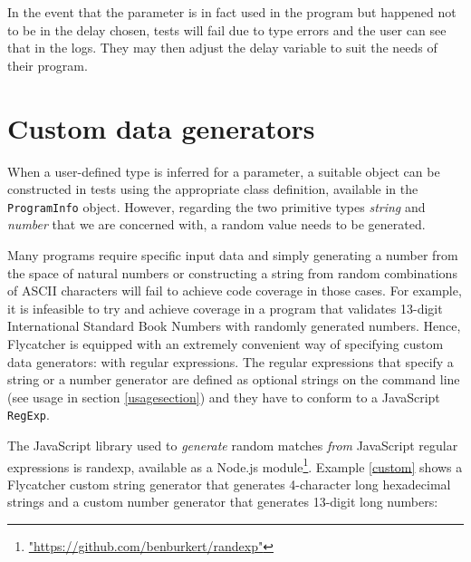 

In the event that the parameter is in fact used in the program but happened not to be in the delay chosen, tests will fail due to type errors and the user can see that in the logs. They may then adjust the delay variable to suit the needs of their program.

\section{Custom data generators}
When a user-defined type is inferred for a parameter, a suitable object can be constructed in tests using the appropriate class definition, available in the \texttt{ProgramInfo} object. However, regarding the two primitive types \emph{string} and \emph{number} that we are concerned with, a random value needs to be generated.

Many programs require specific input data and simply generating a number from the space of natural numbers or constructing a string from random combinations of ASCII characters will fail to achieve code coverage in those cases. For example, it is infeasible to try and achieve coverage in a program that validates 13-digit International Standard Book Numbers with randomly generated numbers. Hence, \textsf{Flycatcher} is equipped with an extremely convenient way of specifying custom data generators: with regular expressions. The regular expressions that specify a string or a number generator are defined as optional strings on the command line (see usage in section \ref{usagesection}) and they have to conform to a JavaScript \texttt{RegExp}.

The JavaScript library used to \emph{generate} random matches \emph{from} JavaScript regular expressions is \textsf{randexp}, available as a \textsf{Node.js} module\footnote{\url{"https://github.com/benburkert/randexp"}}. Example \ref{custom} shows a \textsf{Flycatcher} custom string generator that generates 4-character long hexadecimal strings and a custom number generator that generates 13-digit long numbers:


